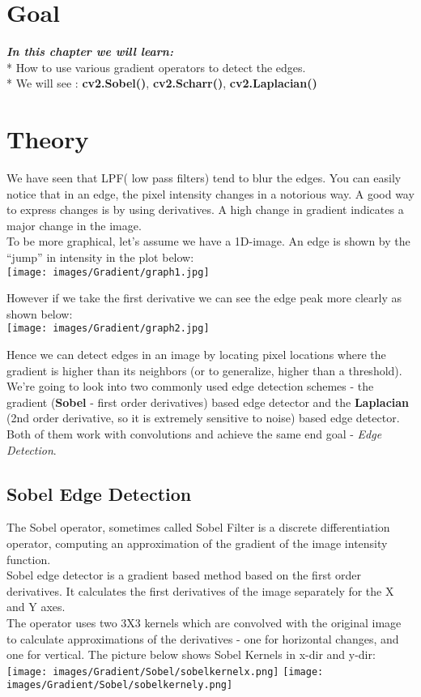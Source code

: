 \documentclass[]{article}
\date{}
\begin{document}
\section{Goal}\label{goal}

\emph{\textbf{In this chapter we will learn:}} \\
* How to use various
gradient operators to detect the edges. \\
* We will see :
\textbf{cv2.Sobel()}, \textbf{cv2.Scharr()}, \textbf{cv2.Laplacian()}

\section{Theory}\label{theory}

We have seen that LPF( low pass filters) tend to blur the edges. You can
easily notice that in an edge, the pixel intensity changes in a
notorious way. A good way to express changes is by using derivatives. A
high change in gradient indicates a major change in the image.\\
To be more graphical, let's assume we have a 1D-image. An edge is shown
by the ``jump'' in intensity in the plot below:\\
\texttt{[image: images/Gradient/graph1.jpg]}

However if we take the first derivative we can see the edge peak more
clearly as shown below:\\
\texttt{[image: images/Gradient/graph2.jpg]}

Hence we can detect edges in an image by locating pixel locations where
the gradient is higher than its neighbors (or to generalize, higher than
a threshold).\\
We're going to look into two commonly used edge detection schemes - the
gradient (\textbf{Sobel} - first order derivatives) based edge detector
and the \textbf{Laplacian} (2nd order derivative, so it is extremely
sensitive to noise) based edge detector. Both of them work with
convolutions and achieve the same end goal - \emph{Edge Detection}.

\subsection{Sobel Edge Detection}\label{sobel-edge-detection}

The Sobel operator, sometimes called Sobel Filter is a discrete
differentiation operator, computing an approximation of the gradient of
the image intensity function.\\
Sobel edge detector is a gradient based method based on the first order
derivatives. It calculates the first derivatives of the image separately
for the X and Y axes.\\
The operator uses two 3X3 kernels which are convolved with the original
image to calculate approximations of the derivatives - one for
horizontal changes, and one for vertical. The picture below shows Sobel
Kernels in x-dir and y-dir:\\
\texttt{[image: images/Gradient/Sobel/sobelkernelx.png]}
\texttt{[image: images/Gradient/Sobel/sobelkernely.png]}
\end{document}
